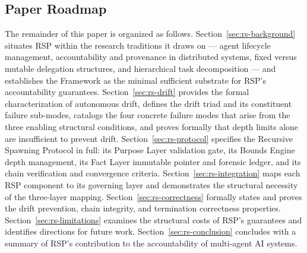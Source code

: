 \subsection{Paper Roadmap}

The remainder of this paper is organized as follows. Section~\ref{sec:rs-background} situates RSP within the research traditions it draws on — agent lifecycle management, accountability and provenance in distributed systems, fixed versus mutable delegation structures, and hierarchical task decomposition — and establishes the \bxthree{} Framework as the minimal sufficient substrate for RSP's accountability guarantees. Section~\ref{sec:rs-drift} provides the formal characterization of autonomous drift, defines the drift triad and its constituent failure sub-modes, catalogs the four concrete failure modes that arise from the three enabling structural conditions, and proves formally that depth limits alone are insufficient to prevent drift. Section~\ref{sec:rs-protocol} specifies the Recursive Spawning Protocol in full: its Purpose Layer validation gate, its Bounds Engine depth management, its Fact Layer immutable pointer and forensic ledger, and its chain verification and convergence criteria. Section~\ref{sec:rs-integration} maps each RSP component to its governing \bxthree{} layer and demonstrates the structural necessity of the three-layer mapping. Section~\ref{sec:rs-correctness} formally states and proves the drift prevention, chain integrity, and termination correctness properties. Section~\ref{sec:rs-limitations} examines the structural costs of RSP's guarantees and identifies directions for future work. Section~\ref{sec:rs-conclusion} concludes with a summary of RSP's contribution to the accountability of multi-agent AI systems.
